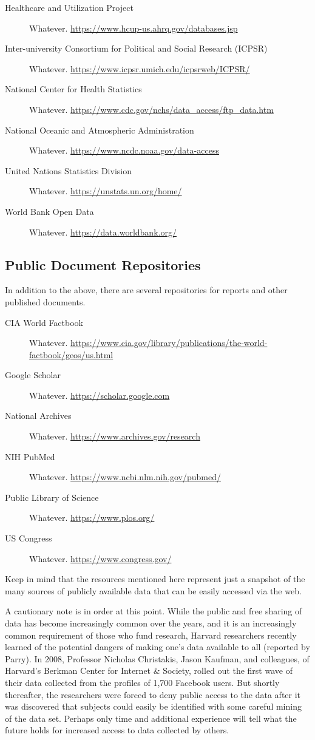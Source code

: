 \begin{description}
	\item[Healthcare and Utilization Project] Whatever. \url{https://www.hcup-us.ahrq.gov/databases.jsp}
	\item[Inter-university Consortium for Political and Social Research (ICPSR)] Whatever. \url{https://www.icpsr.umich.edu/icpsrweb/ICPSR/}
	\item[National Center for Health Statistics] Whatever. \url{https://www.cdc.gov/nchs/data_access/ftp_data.htm}
	\item[National Oceanic and Atmospheric Administration] Whatever. \url{https://www.ncdc.noaa.gov/data-access}
	\item[United Nations Statistics Division] Whatever. \url{https://unstats.un.org/home/}
	\item[World Bank Open Data] Whatever. \url{https://data.worldbank.org/}
\end{description}

\subsection{Public Document Repositories}

In addition to the above, there are several repositories for reports and other published documents. 

\begin{description}
	\item[CIA World Factbook] Whatever. \url{https://www.cia.gov/library/publications/the-world-factbook/geos/us.html}	\item[Google Scholar] Whatever. \url{https://scholar.google.com}
	\item[National Archives] Whatever. \url{https://www.archives.gov/research}
	\item[NIH PubMed] Whatever. \url{https://www.ncbi.nlm.nih.gov/pubmed/}
	\item[Public Library of Science] Whatever. \url{https://www.plos.org/}
	\item[US Congress] Whatever. \url{https://www.congress.gov/}
\end{description}

Keep in mind that the resources mentioned here represent just a snapshot of the many sources of publicly available data that can be easily accessed via the web. 

A cautionary note is in order at this point. While the public and free sharing of data has become increasingly common over the years, and it is an increasingly common requirement of those who fund research, Harvard researchers recently learned of the potential dangers of making one's data available to all (reported by Parry\cite{parry2011harvard}). In 2008, Professor Nicholas Christakis, Jason Kaufman, and colleagues, of Harvard's Berkman Center for Internet \& Society, rolled out the first wave of their data collected from the profiles of 1,700 Facebook users. But shortly thereafter, the researchers were forced to deny public access to the data after it was discovered that subjects could easily be identified with some careful mining of the data set. Perhaps only time and additional experience will tell what the future holds for increased access to data collected by others.

